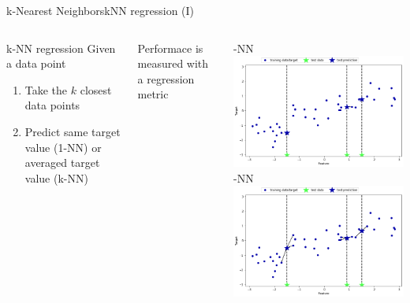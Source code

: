 \documentclass[10pt,compress]{beamer} %
\begin{document}
\begin{frame}{k-Nearest Neighbors}{kNN regression (I)}
    \begin{columns}
        \begin{block}{k-NN regression}
         Given a data point
        \begin{enumerate}
            \item Take the $k$ closest data points
            \item Predict same target value (1-NN) or averaged target value (k-NN)
        \end{enumerate}
        \end{block}

        Performace is measured with a regression metric %

        -NN\\
	        \includegraphics[width=\textwidth]{figs/1-nn-reg.png}
         -NN\\
	        \includegraphics[width=\textwidth]{figs/3-nn-reg.png}
    \end{columns}
\end{frame}
\end{document}
